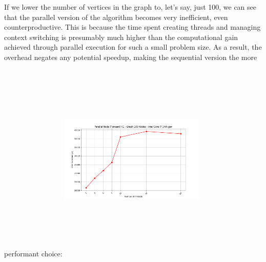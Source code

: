 \documentclass{aes2e}
\begin{document}
If we lower the number of vertices in the graph to, let's say, just 100, we can see that the parallel version of the algorithm becomes very inefficient, even counterproductive. This is because the time spent creating threads and managing context switching is presumably much higher than the computational gain achieved through parallel execution for such a small problem size. As a result, the overhead negates any potential speedup, making the sequential version the more performant choice:
\includegraphics[width=0.52\textwidth, height=10cm, keepaspectratio]{charts/Parallel Node (Forward) V1 - Graph 100 Nodes - Intel Core i7 14th gen.png}
\end{document}
